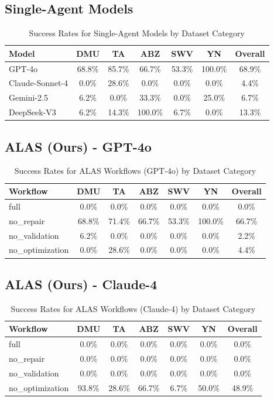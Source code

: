 \documentclass{article}
\begin{document}
\subsection*{Single-Agent Models}
\begin{longtable}{|l|c|c|c|c|c|c|}
\caption{Success Rates for Single-Agent Models by Dataset Category} \\
\toprule
\textbf{Model} & \textbf{DMU} & \textbf{TA} & \textbf{ABZ} & \textbf{SWV} & \textbf{YN} & \textbf{Overall} \\
\midrule
\endhead
GPT-4o & 68.8\% & 85.7\% & 66.7\% & 53.3\% & 100.0\% & 68.9\% \\
Claude-Sonnet-4 & 0.0\% & 28.6\% & 0.0\% & 0.0\% & 0.0\% & 4.4\% \\
Gemini-2.5 & 6.2\% & 0.0\% & 33.3\% & 0.0\% & 25.0\% & 6.7\% \\
DeepSeek-V3 & 6.2\% & 14.3\% & 100.0\% & 6.7\% & 0.0\% & 13.3\% \\
\bottomrule
\end{longtable}

\subsection*{ALAS (Ours) - GPT-4o}
\begin{longtable}{|l|c|c|c|c|c|c|}
\caption{Success Rates for ALAS Workflows (GPT-4o) by Dataset Category} \\
\toprule
\textbf{Workflow} & \textbf{DMU} & \textbf{TA} & \textbf{ABZ} & \textbf{SWV} & \textbf{YN} & \textbf{Overall} \\
\midrule
\endhead
full & 0.0\% & 0.0\% & 0.0\% & 0.0\% & 0.0\% & 0.0\% \\
no_repair & 68.8\% & 71.4\% & 66.7\% & 53.3\% & 100.0\% & 66.7\% \\
no_validation & 6.2\% & 0.0\% & 0.0\% & 0.0\% & 0.0\% & 2.2\% \\
no_optimization & 0.0\% & 28.6\% & 0.0\% & 0.0\% & 0.0\% & 4.4\% \\
\bottomrule
\end{longtable}

\subsection*{ALAS (Ours) - Claude-4}
\begin{longtable}{|l|c|c|c|c|c|c|}
\caption{Success Rates for ALAS Workflows (Claude-4) by Dataset Category} \\
\toprule
\textbf{Workflow} & \textbf{DMU} & \textbf{TA} & \textbf{ABZ} & \textbf{SWV} & \textbf{YN} & \textbf{Overall} \\
\midrule
\endhead
full & 0.0\% & 0.0\% & 0.0\% & 0.0\% & 0.0\% & 0.0\% \\
no_repair & 0.0\% & 0.0\% & 0.0\% & 0.0\% & 0.0\% & 0.0\% \\
no_validation & 0.0\% & 0.0\% & 0.0\% & 0.0\% & 0.0\% & 0.0\% \\
no_optimization & 93.8\% & 28.6\% & 66.7\% & 6.7\% & 50.0\% & 48.9\% \\
\bottomrule
\end{longtable}
\end{document}
